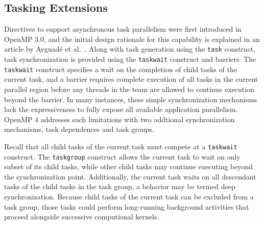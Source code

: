 \subsection{Tasking Extensions}
\label{sub:tasking}



Directives to support asynchronous task parallelism were first introduced in OpenMP 3.0, and the initial design rationale for this capability is explained in an article by Ayguad\'{e} et al.~\cite{ayguade2009tpds}.  Along with task generation using the \texttt{task} construct, task synchronization is provided using the \texttt{taskwait} construct and barriers.  The \texttt{taskwait} construct specifies a wait on the completion of child tasks of the current task, and a barrier requires complete execution of all tasks in the current parallel region before any threads in the team are allowed to continue execution beyond the barrier.  In many instances, these simple synchronization mechanisms lack the expressiveness to fully expose all available application parallelism.  OpenMP 4 addresses such limitations with two addtional synchronization mechanisms, task dependences and task groups.




Recall that all child tasks of the current task must compete at a \texttt{taskwait} construct.  The \texttt{taskgroup} construct allows the current task to wait on only subset of its child tasks, while other child tasks may continue executing beyond the synchronization point.  Additionally, the current task waits on all descendant tasks of the child tasks in the task group, a behavior may be termed deep synchronization.  Because child tasks of the current task can be excluded from a task group, those tasks could perform long-running background activities that proceed alongside successive computional kernels.


